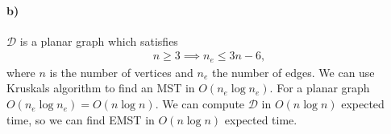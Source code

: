 \documentclass[10pt,a4paper,final,oneside,openany,article,oldfontcommands]{memoir}
\newcommand{\D}{\mathcal{D}}
\begin{document}
\paragraph{b)}
$\D$ is a planar graph which satisfies
\begin{align*}
  n \ge 3 \implies n_e \le 3n - 6,
\end{align*}
where $n$ is the number of vertices and $n_e$ the number of edges. We can use Kruskals algorithm to find an MST in $O(n_e \log n_e)$. For a planar graph $O(n_e \log n_e) = O(n \log n)$. We can compute $\D$ in $O(n \log n)$ expected time, so we can find EMST in $O(n \log n)$ expected time.

\printbibliography
\end{document}

